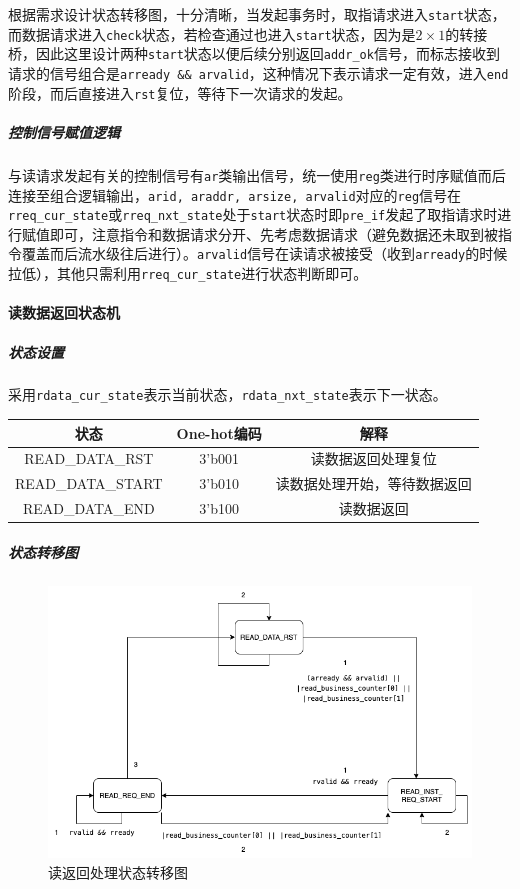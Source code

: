 \documentclass[UTF-8,twoside,c5size]{ctexart}
\begin{document}
	根据需求设计状态转移图，十分清晰，当发起事务时，取指请求进入\texttt{start}状态，而数据请求进入\texttt{check}状态，若检查通过也进入\texttt{start}状态，因为是$2\times 1$的转接桥，因此这里设计两种\texttt{start}状态以便后续分别返回\texttt{addr_ok}信号，而标志接收到请求的信号组合是\texttt{arready \&\& arvalid}，这种情况下表示请求一定有效，进入\texttt{end}阶段，而后直接进入\texttt{rst}复位，等待下一次请求的发起。
	
	\subparagraph{控制信号赋值逻辑}\hfill
	
	与读请求发起有关的控制信号有\texttt{ar}类输出信号，统一使用\texttt{reg}类进行时序赋值而后连接至组合逻辑输出，\texttt{arid, araddr, arsize, arvalid}对应的\texttt{reg}信号在\texttt{rreq_cur_state}或\texttt{rreq_nxt_state}处于\texttt{start}状态时即\texttt{pre_if}发起了取指请求时进行赋值即可，注意指令和数据请求分开、先考虑数据请求（避免数据还未取到被指令覆盖而后流水级往后进行）。\texttt{arvalid}信号在读请求被接受（收到\texttt{arready}的时候拉低），其他只需利用\texttt{rreq_cur_state}进行状态判断即可。
	
	\paragraph{读数据返回状态机}\hfill
	
	\subparagraph{状态设置}\hfill
	
	采用\texttt{rdata_cur_state}表示当前状态，\texttt{rdata_nxt_state}表示下一状态。
	
	\begin{center}
	\begin{tabular}{|c|c|c|}
	\hline
  	\textbf{状态} & \textbf{One-hot编码} & \textbf{解释} \\
  	\hline
	READ_DATA_RST & 3'b001 & 读数据返回处理复位 \\
	\hline
	READ_DATA_START & 3'b010 & 读数据处理开始，等待数据返回 \\
	\hline
	READ_DATA_END & 3'b100 & 读数据返回 \\
	\hline
	\end{tabular}
	\end{center}
	
	\subparagraph{状态转移图}\hfill
	
	\begin{figure}[h]
		\centering
		\includegraphics[width=0.75\linewidth]{figures/RDATA.png}
		\caption[rreq_status]{读返回处理状态转移图}
		\label{fig:rreq_status}
	\end{figure}
	
\end{document}
